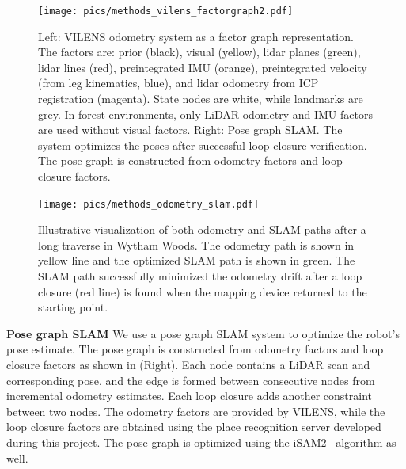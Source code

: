 \begin{figure}[t]
  \centering
  \texttt{[image: pics/methods\_vilens\_factorgraph2.pdf]}
  \caption{Left: VILENS odometry system as a factor graph representation. The factors are: prior (black), visual
 (yellow), lidar planes (green), lidar lines (red), preintegrated IMU (orange), preintegrated velocity (from leg kinematics, blue), and lidar odometry from ICP registration (magenta). State nodes are white, while landmarks are grey. In forest environments, only LiDAR odometry and IMU factors are used without visual factors. Right: Pose graph SLAM. The system optimizes the poses after successful loop closure verification. The pose graph is constructed from odometry factors and loop closure factors.}
  \label{fig:vilens_factorgraph}
\end{figure}

\begin{figure}[htbp]
  \centering
  \texttt{[image: pics/methods\_odometry\_slam.pdf]}
  \caption{Illustrative visualization of both odometry and SLAM paths after a long traverse in Wytham Woods. The odometry path is shown in yellow line and the optimized SLAM path is shown in green. The SLAM path successfully minimized the odometry drift after a loop closure (red line) is found when the mapping device returned to the starting point.}
  \label{fig:odometry_slam}
\end{figure}

\noindent \textbf{Pose graph SLAM}\hspace{0.5em}  We use a pose graph SLAM system to optimize the robot's pose estimate. The pose graph is constructed from odometry factors and loop closure factors as shown in  (Right). Each node contains a LiDAR scan and corresponding pose, and the edge is formed between consecutive nodes from incremental odometry estimates. Each loop closure adds another constraint between two nodes. The odometry factors are provided by VILENS, while the loop closure factors are obtained using the place recognition server developed during this project. The pose graph is optimized using the iSAM2~\cite{Kaess2012} algorithm as well. \\

